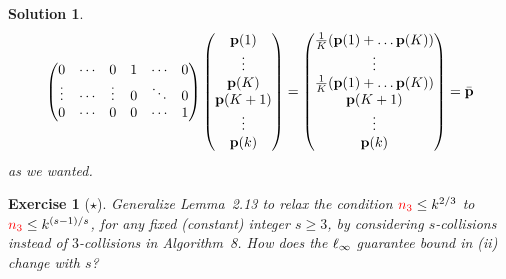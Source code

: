 \documentclass[biber,plain]{nowfnt} %
\newtheorem{question}{Exercise}[chapter]
\newtheorem{solution}{Solution}[chapter]
\newcommand{\nsu}{\textcolor{red}{\ns_3}}
\newcommand{\nsu}{\ns_3}
\begin{document}
\begin{solution}
\[\begin{pmatrix}
	0 & \cdots & 0 & 1 &\cdots & 0\\
	\vdots & \cdots & \vdots & 0 &\ddots & 0\\
	0 & \cdots & 0 & 0 &\cdots & 1\\
	\end{pmatrix} 
	\begin{pmatrix}
	\p(1)\\
	\vdots \\
	\p(K)\\
	\p(K+1)\\
	\vdots\\
	\p(\ab)
	\end{pmatrix} 
	= \begin{pmatrix}
	\frac{1}{K}(\p(1)+\dots \p(K))\\
	\vdots \\
	\frac{1}{K}(\p(1)+\dots \p(K))\\
	\p(K+1)\\
	\vdots\\
	\p(\ab)
	\end{pmatrix} 
	= \bar{\p}
\]
as we wanted.
\end{solution}
\begin{question}[$\star$]\label{ex:linftycheck}
  Generalize Lemma~2.13 to relax the condition $\nsu \leq \ab^{2/3}$ to $\nsu \leq \ab^{(s-1)/s}$, for any fixed (constant) integer $s\geq 3$, by considering $s$-collisions instead of $3$-collisions in Algorithm~8. How does the $\lp[\infty]$ guarantee bound in (ii) change with $s$?
\end{question}
\end{document}
